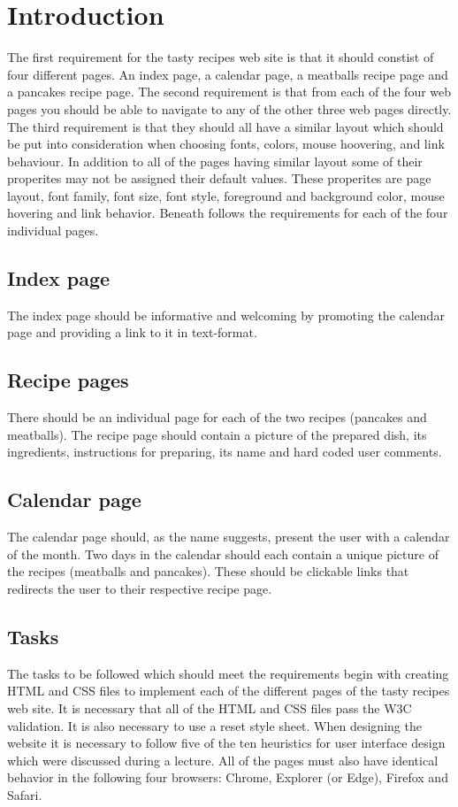 \documentclass[a4paper]{scrartcl}
\begin{document}
\section{Introduction}
The first requirement for the tasty recipes web site is that it should constist of four different pages. An index page, a calendar page, a meatballs recipe page and a pancakes recipe page. The second requirement is that from each of the four web pages you should be able to navigate to any of the other three web pages directly. The third requirement is that they should all have a similar layout which should be put into consideration when choosing fonts, colors, mouse hoovering, and link behaviour. In addition to all of the pages having similar layout some of their properites may not be assigned their default values. These properites are page layout, font family, font size, font style, foreground and background color, mouse hovering and link behavior. Beneath follows the requirements for each of the four individual pages.

\subsection{Index page}
The index page should be informative and welcoming by promoting the calendar page and providing a link to it in text-format.

\subsection{Recipe pages}
There should be an individual page for each of the two recipes (pancakes and meatballs). The recipe page should contain a picture of the prepared dish, its ingredients, instructions for preparing, its name and hard coded user comments.

\subsection{Calendar page}
The calendar page should, as the name suggests, present the user with a calendar of the month. Two days in the calendar should each contain a unique picture of the recipes (meatballs and pancakes). These should be clickable links that redirects the user to their respective recipe page.

\subsection{Tasks}
The tasks to be followed which should meet the requirements begin with creating HTML and CSS files to implement each of the different pages of the tasty recipes web site. It is necessary that all of the HTML and CSS files pass the W3C validation. It is also necessary to use a reset style sheet. When designing the website it is necessary to follow five of the ten heuristics for user interface design which were discussed during a lecture. All of the pages must also have identical behavior in the following four browsers: Chrome, Explorer (or Edge), Firefox and Safari.
\end{document}
